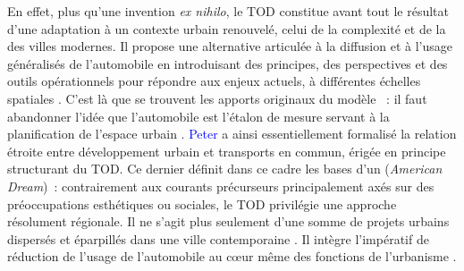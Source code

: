 \begin{refsegment}
En effet, plus qu’une invention \textsl{ex nihilo}, le \acrshort{TOD} constitue avant tout le résultat d’une adaptation à un contexte urbain renouvelé, celui de la complexité et de la  des villes modernes. Il propose une alternative articulée à la diffusion et à l'usage généralisés de l'automobile en introduisant des principes, des perspectives et des outils opérationnels pour répondre aux enjeux actuels, à différentes échelles spatiales \textcolor{blue}{\autocite[37]{leysens_reconfiguration_2011}}. C'est là que se trouvent les apports originaux du modèle \textcolor{blue}{\autocite[121]{lo_feudo_scenario_2014}}~: il faut abandonner l'idée que l'automobile est l'étalon de mesure servant à la planification de l'espace urbain \textcolor{blue}{\autocite[190]{ducharme_ville_2021}}. \textcolor{blue}{Peter} \textcolor{blue}{\textcite{calthorpe_next_1993}} a ainsi essentiellement formalisé la relation étroite entre développement urbain et transports en commun, érigée en principe structurant du \acrshort{TOD}. Ce dernier définit dans ce cadre les bases d’un  (\textsl{American Dream})~: contrairement aux courants précurseurs principalement axés sur des préoccupations esthétiques ou sociales, le \acrshort{TOD} privilégie une approche résolument régionale. Il ne s'agit plus seulement d'une somme de projets urbains dispersés et éparpillés dans une ville contemporaine \textcolor{blue}{\autocite[357]{mongin_ville_2013}}. Il intègre l’impératif de réduction de l’usage de l’automobile au cœur même des fonctions de l’urbanisme \textcolor{blue}{\autocite[11]{calthorpe_next_1993}}.%


\end{refsegment}
